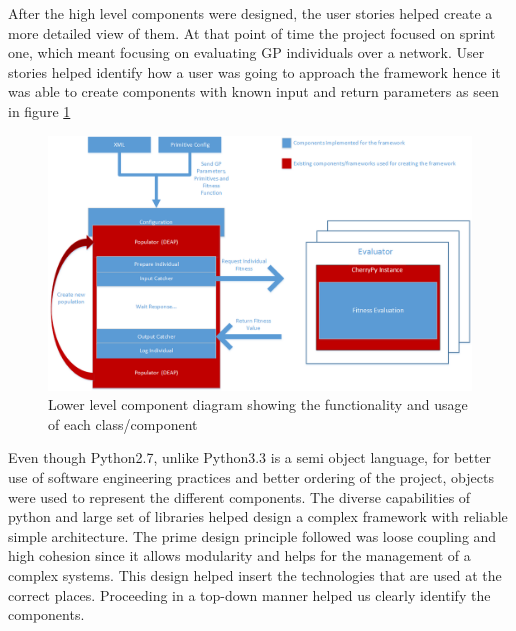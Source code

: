 After the high level components were designed, the user stories helped create a more detailed view of them. At that point of
time the project focused on sprint one, which meant focusing on evaluating GP individuals over a network.
User stories helped identify how a user was going to approach the framework hence it was able to create components with known
input and return parameters as seen in figure \ref{fig:firstSprint}


\begin{figure}[htp]
\centering
\includegraphics[scale=0.6]{Figures/FirstSprint.png}
\caption{Lower level component diagram showing the functionality and usage of each class/component}
\label{fig:firstSprint}
\end{figure}


Even though Python2.7, unlike Python3.3 is a semi object language, for better use of software engineering practices and better ordering of the project,
objects were used to represent the different components. The diverse capabilities of python and large set of libraries helped design a complex framework with reliable simple architecture. The prime design principle followed
was loose coupling and high cohesion since it allows modularity and helps for the management of a complex systems. This design helped insert the technologies that are used at the correct
places. Proceeding in a top-down manner helped us clearly identify the components.
